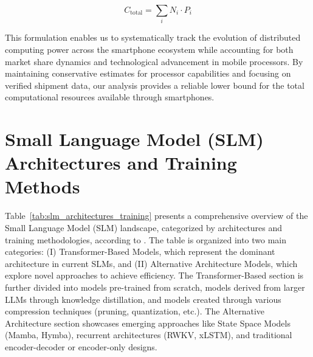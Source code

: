 \begin{equation}
    C_{\text{total}} = \sum_{i} N_i \cdot P_i
\end{equation}

This formulation enables us to systematically track the evolution of distributed computing power across the smartphone ecosystem while accounting for both market share dynamics and technological advancement in mobile processors. By maintaining conservative estimates for processor capabilities and focusing on verified shipment data, our analysis provides a reliable lower bound for the total computational resources available through smartphones.

\section{Small Language Model (SLM) Architectures and Training Methods}
\label{app:slm_architectures_training}

Table~\ref{tab:slm_architectures_training} presents a comprehensive overview of the Small Language Model (SLM) landscape, categorized by architectures and training methodologies, according to \cite{wang2024comprehensive}. The table is organized into two main categories: (I) Transformer-Based Models, which represent the dominant architecture in current SLMs, and (II) Alternative Architecture Models, which explore novel approaches to achieve efficiency. The Transformer-Based section is further divided into models pre-trained from scratch, models derived from larger LLMs through knowledge distillation, and models created through various compression techniques (pruning, quantization, etc.). The Alternative Architecture section showcases emerging approaches like State Space Models (Mamba, Hymba), recurrent architectures (RWKV, xLSTM), and traditional encoder-decoder or encoder-only designs. 


